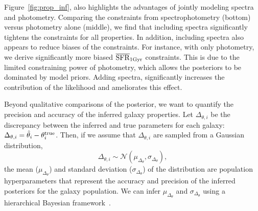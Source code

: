 Figure~\ref{fig:prop_inf}, also highlights the advantages of jointly modeling
spectra and photometry. 
Comparing the constraints from spectrophotometry (bottom) versus photometry
alone (middle), we find that including spectra significantly tightens the
constraints for all properties. 
In addition, including spectra also appears to reduce biases of the
constraints. 
For instance, with only photometry, we derive significantly more biased
$\overline{\rm SFR}_{\rm 1Gyr}$ constraints.
This is due to the limited constraining power of photometry, which allows the
posteriors to be dominated by model priors. 
Adding spectra, significantly increases the contribution of the likelihood and
ameliorates this effect. 

Beyond qualitative comparisons of the posterior, we want to quantify the
precision and accuracy of the inferred galaxy properties. 
Let $\Delta_{\theta,i}$ be the discrepancy between the inferred and true
parameters for each galaxy: 
$\Delta_{\theta,i} = \hat{\theta}_i - \theta^{\rm true}_i$.
Then, if we assume that $\Delta_{\theta,i}$ are sampled from a Gaussian
distribution,
\begin{equation} \label{eq:eta_gauss}
    \Delta_{\theta,i} \sim \mathcal{N}(\mu_{\Delta_{\theta}}, \sigma_{\Delta_{\theta}}),
\end{equation}
the mean ($\mu_{\Delta_{\theta}}$) and standard deviation
($\sigma_{\Delta_{\theta}}$) of the distribution are population hyperparameters
that represent the accuracy and precision of the inferred posteriors for the
galaxy population. 
We can infer $\mu_{\Delta_{\theta}}$ and $\sigma_{\Delta_{\theta}}$ using a
hierarchical Bayesian framework~\citep[\emph{e.g.}][]{hogg2010,
foreman-mackey2014, baronchelli2020}.

